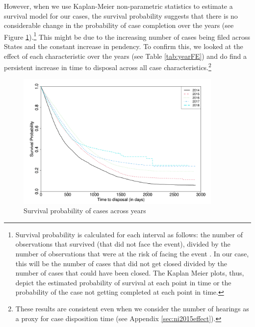 \documentclass[12pt,a4paper]{article}
\begin{document}
However, when we use Kaplan-Meier non-parametric statistics to estimate a survival model for our cases, the survival probability suggests that there is no considerable change in the probability of case completion over the years (see Figure \ref{fig:yearSurvival}).\footnote{Survival probability is calculated for each interval as follows: the number of observations that survived (that did not face the event), divided by the number of observations that were at the risk of facing the event \autocite{rich2010practical}. In our case, this will be the number of cases that did not get closed divided by the number of cases that could have been closed. The Kaplan Meier plots, thus, depict the estimated probability of survival at each point in time or the probability of the case not getting completed at each point in time.} This might be due to the increasing number of cases being filed across States and the constant increase in pendency. To confirm this, we looked at the effect of each characteristic over the years (see Table \ref{tab:yearFE}) and do find a persistent increase in time to disposal across all case characteristics.\footnote{These results are consistent even when we consider the number of hearings as a proxy for case disposition time (see Appendix \ref{sec:ni2015effect}).}

\begin{figure}[ht]
\centering
\caption{Survival probability of cases across years}\label{fig:yearSurvival}
\includegraphics[width = 0.9\textwidth]{surv_years-1.png}
\end{figure}
\end{document}
